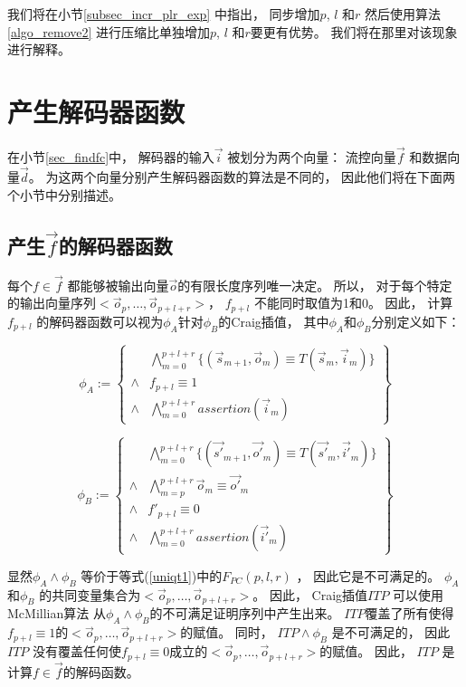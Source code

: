我们将在小节\ref{subsec_incr_plr_exp} 中指出，
同步增加$p$, $l$ 和$r$ 然后使用算法\ref{algo_remove2} 进行压缩比单独增加$p$, $l$ 和$r$要更有优势。
我们将在那里对该现象进行解释。





\section{产生解码器函数}\label{sec_char}
在小节\ref{sec_findfc}中，
解码器的输入$\vec{i}$ 被划分为两个向量：
流控向量$\vec{f}$ 和数据向量$\vec{d}$。
为这两个向量分别产生解码器函数的算法是不同的，
因此他们将在下面两个小节中分别描述。

\subsection{产生$\vec{f}$的解码器函数}\label{subsec_fdec}

每个$f\in \vec{f}$ 都能够被输出向量$\vec{o}$的有限长度序列唯一决定。
所以，
对于每个特定的输出向量序列$<\vec{o}_p,\dots,\vec{o}_{p+l+r}>$，
$f_{p+l}$ 不能同时取值为1和0。
因此，
计算$f_{p+l}$ 的解码器函数可以视为$\phi_A$针对$\phi_B$的Craig插值，
其中$\phi_A$和$\phi_B$分别定义如下：

\begin{equation}\label{fa}
\phi_A:=
\left\{
\begin{array}{cc}
&\bigwedge_{m=0}^{p+l+r}
\{
(\vec{s}_{m+1},\vec{o}_m)\equiv T(\vec{s}_m,\vec{i}_m)
\}
\\
\wedge& f_{p+l}\equiv 1 \\
\wedge&\bigwedge_{m=0}^{p+l+r}assertion(\vec{i}_m)
\end{array}
\right\}
\end{equation}

\begin{equation}\label{fb}
\phi_B:=
\left\{
\begin{array}{cc}
&\bigwedge_{m=0}^{p+l+r}
\{
(\vec{s'}_{m+1},\vec{o'}_m)\equiv T(\vec{s'}_m,\vec{i'}_m)
\}
\\
\wedge&\bigwedge_{m=p}^{p+l+r}\vec{o}_m\equiv \vec{o'}_m \\
\wedge& f'_{p+l}\equiv 0 \\
\wedge&\bigwedge_{m=0}^{p+l+r}assertion(\vec{i'}_m)
\end{array}
\right\}
\end{equation}

显然$\phi_A\wedge \phi_B$ 等价于等式(\ref{uniqt1})中的$F_{PC}(p,l,r)$ ，
因此它是不可满足的。
$\phi_A$ 和$\phi_B$ 的共同变量集合为$<\vec{o}_p,\dots,\vec{o}_{p+l+r}>$。
因此，
Craig插值$ITP$ 可以使用McMillian算法 从$\phi_A\wedge \phi_B$的不可满足证明序列中产生出来。
$ITP$覆盖了所有使得$f_{p+l}\equiv 1$的$<\vec{o}_p,\dots,\vec{o}_{p+l+r}>$的赋值。
同时，
$ITP\wedge \phi_B$ 是不可满足的，
因此$ITP$ 没有覆盖任何使$f_{p+l}\equiv 0$成立的$<\vec{o}_p,\dots,\vec{o}_{p+l+r}>$的赋值。
因此，
$ITP$ 是计算$f\in\vec{f}$的解码函数。

